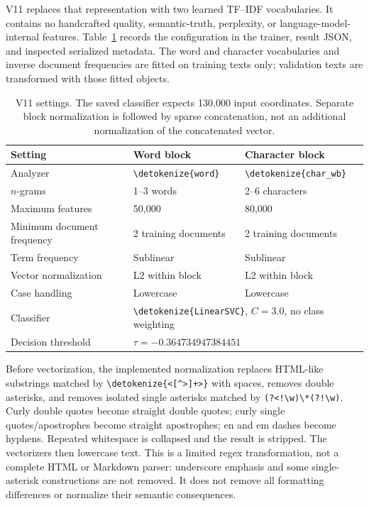 \documentclass[11pt]{article}
\newcommand{\code}[1]{\expandafter\nolinkurl\expandafter{\detokenize{#1}}}
\begin{document}
V11 replaces that representation with two learned TF--IDF vocabularies.
It contains no handcrafted quality, semantic-truth, perplexity, or
language-model-internal features. Table~\ref{tab:v11config} records the
configuration in the trainer, result JSON, and inspected serialized metadata.
The word and character vocabularies and inverse document frequencies are
fitted on training texts only; validation texts are transformed with those
fitted objects.

\begin{table}[htbp]
\centering\small
\begin{tabularx}{\linewidth}{lXX}
\toprule
Setting & Word block & Character block \\
\midrule
Analyzer & \code{word} & \code{char_wb} \\
$n$-grams & 1--3 words & 2--6 characters \\
Maximum features & 50,000 & 80,000 \\
Minimum document frequency & 2 training documents & 2 training documents \\
Term frequency & Sublinear & Sublinear \\
Vector normalization & L2 within block & L2 within block \\
Case handling & Lowercase & Lowercase \\
\midrule
Classifier & \multicolumn{2}{l}{\code{LinearSVC}, $C=3.0$, no class weighting} \\
Decision threshold & \multicolumn{2}{l}{$\tau=-0.364734947384451$} \\
\bottomrule
\end{tabularx}
\caption{V11 settings. The saved classifier expects 130,000 input coordinates.
Separate block normalization is followed by sparse concatenation, not an
additional normalization of the concatenated vector.}
\label{tab:v11config}
\end{table}

Before vectorization, the implemented normalization replaces HTML-like
substrings matched by \code{<[^>]+>} with spaces, removes double asterisks,
and removes isolated single asterisks matched by
\verb|(?<!\w)\*(?!\w)|. Curly double quotes become straight double quotes;
curly single quotes/apostrophes become straight apostrophes; en and em dashes
become hyphens. Repeated whitespace is collapsed and the result is stripped.
The vectorizers then lowercase text. This is a limited regex transformation,
not a complete HTML or Markdown parser: underscore emphasis and some
single-asterisk constructions are not removed. It does not remove all
formatting differences or normalize their semantic consequences.
\end{document}
